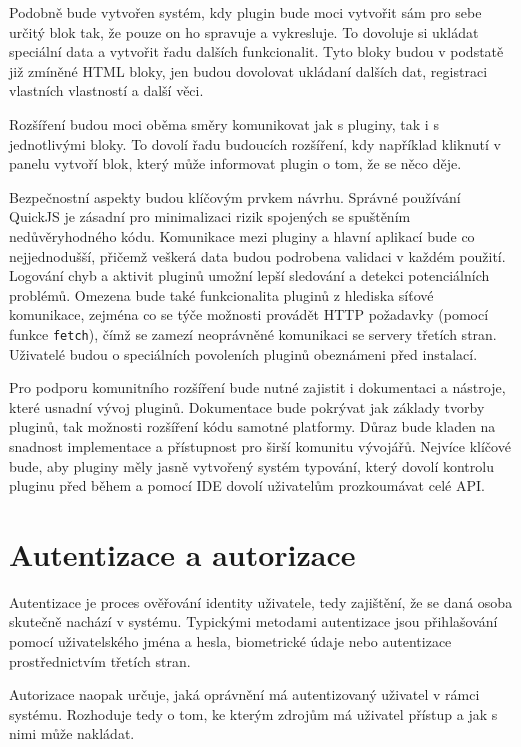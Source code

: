 Podobně bude vytvořen systém, kdy plugin bude moci vytvořit sám pro sebe určitý blok tak, že pouze on ho spravuje a vykresluje.
To dovoluje si ukládat speciální data a vytvořit řadu dalších funkcionalit.
Tyto bloky budou v podstatě již zmíněné HTML bloky, jen budou dovolovat ukládaní dalších dat, registraci vlastních vlastností a další věci.

Rozšíření budou moci oběma směry komunikovat jak s pluginy, tak i s jednotlivými bloky.
To dovolí řadu budoucích rozšíření, kdy například kliknutí v panelu vytvoří blok, který může informovat plugin o tom, že se něco děje.

Bezpečnostní aspekty budou klíčovým prvkem návrhu.
Správné používání QuickJS je zásadní pro minimalizaci rizik spojených se spuštěním nedůvěryhodného kódu.
Komunikace mezi pluginy a hlavní aplikací bude co nejjednodušší, přičemž veškerá data budou podrobena validaci v každém použití.
Logování chyb a aktivit pluginů umožní lepší sledování a detekci potenciálních problémů.
Omezena bude také funkcionalita pluginů z hlediska síťové komunikace, zejména co se týče možnosti provádět HTTP požadavky (pomocí funkce \texttt{fetch}), čímž se zamezí neoprávněné komunikaci se servery třetích stran.
Uživatelé budou o speciálních povoleních pluginů obeznámeni před instalací.

Pro podporu komunitního rozšíření bude nutné zajistit i dokumentaci a nástroje, které usnadní vývoj pluginů. 
Dokumentace bude pokrývat jak základy tvorby pluginů, tak možnosti rozšíření kódu samotné platformy. 
Důraz bude kladen na snadnost implementace a přístupnost pro širší komunitu vývojářů.
Nejvíce klíčové bude, aby pluginy měly jasně vytvořený systém typování, který dovolí kontrolu pluginu před během a pomocí IDE dovolí uživatelům prozkoumávat celé API.

\section{Autentizace a autorizace}\label{text:navrh/auth}

Autentizace je proces ověřování identity uživatele, tedy zajištění, že se daná osoba skutečně nachází v systému. 
Typickými metodami autentizace jsou přihlašování pomocí uživatelského jména a hesla, biometrické údaje nebo autentizace prostřednictvím třetích stran.

Autorizace naopak určuje, jaká oprávnění má autentizovaný uživatel v rámci systému.
Rozhoduje tedy o tom, ke kterým zdrojům má uživatel přístup a jak s nimi může nakládat.

